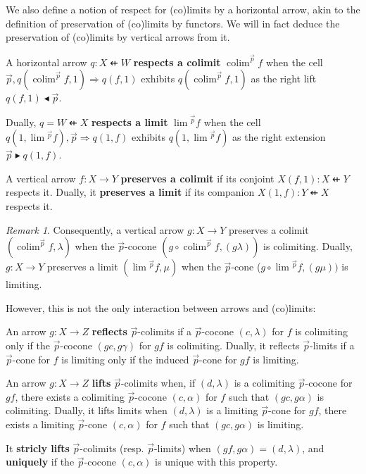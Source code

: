 \documentclass[10pt,a4paper]{article}
\newcommand{\To}{\Rightarrow}
\newcommand{\dfrom}{\nvleftarrow}
\newcommand{\rext}{\mathbin{\blacktriangleright}}
\newcommand{\rift}{\mathbin{\blacktriangleleft}}
\DeclareMathOperator{\colim}{colim}
\theoremstyle{plain}
\theoremstyle{definition}
\theoremstyle{remark}
\newtheorem{remark}[theorem]{Remark}
\begin{document}
We also define a notion of respect for (co)limits by a horizontal arrow, akin to the definition of preservation of (co)limits by functors. We will in fact deduce the preservation of (co)limits by vertical arrows from it.

\begin{definition}
    A horizontal arrow $q : X \dfrom W$ \textbf{respects a colimit} $\colim^{\vec{p}}f$ when the cell $\vec{p}, q(\colim^{\vec{p}}f, 1) \To q(f, 1)$ exhibits $q(\colim^{\vec{p}}f, 1)$ as the right lift $q(f, 1) \rift \vec{p}$.

    \noindent
    Dually, $q = W \dfrom X$ \textbf{respects a limit} $\lim{}^{\vec{p}}f$ when the cell $q(1, \lim{}^{\vec{p}}f), \vec{p} \To q(1, f)$ exhibits $q(1, \lim{}^{\vec{p}}f)$ as the right extension $\vec{p} \rext q(1, f)$.
\end{definition}

\begin{definition}
    A vertical arrow $f : X \to Y$ \textbf{preserves a colimit} if its conjoint $X(f, 1) : X \dfrom Y$ respects it. Dually, it \textbf{preserves a limit} if its companion $X(1, f) : Y \dfrom X$ respects it.
\end{definition}

\begin{remark}
    Consequently, a vertical arrow $g : X \to Y$ preserves a colimit $(\colim^{\vec{p}}f, \lambda)$ when the $\vec{p}$-cocone $(g\circ\colim^{\vec{p}}f, (g\lambda))$ is colimiting. Dually, $g : X \to Y$ preserves a limit $(\lim{}^{\vec{p}}f, \mu)$ when the $\vec{p}$-cone ($g\circ\lim{}^{\vec{p}}f, (g\mu))$ is limiting.
\end{remark}

However, this is not the only interaction between arrows and (co)limits:

\begin{definition}
    An arrow $g : X \to Z$ \textbf{reflects} $\vec p$-colimits if a $\vec p$-cocone $(c, \lambda)$ for $f$ is colimiting only if the $\vec p$-cocone $(gc, g\gamma)$ for $gf$ is colimiting. Dually, it reflects $\vec p$-limits if a $\vec p$-cone for $f$ is limiting only if the induced $\vec p$-cone for $gf$ is limiting.
\end{definition}

\begin{definition}
    An arrow $g : X \to Z$ \textbf{lifts} $\vec p$-colimits when, if $(d, \lambda)$ is a colimiting $\vec p$-cocone for $gf$, there exists a colimiting $\vec p$-cocone $(c, \alpha)$ for $f$ such that $(gc, g\alpha)$ is colimiting. Dually, it lifts limits when $(d, \lambda)$ is a limiting $\vec p$-cone for $gf$, there exists a limiting $\vec p$-cone $(c, \alpha)$ for $f$ such that $(gc, g\alpha)$ is limiting.

    It \textbf{stricly lifts} $\vec p$-colimits (resp. $\vec p$-limits) when $(gf, g\alpha) = (d, \lambda)$, and \textbf{uniquely} if the $\vec p$-cocone $(c, \alpha)$ is unique with this property.
\end{definition}
\end{document}
